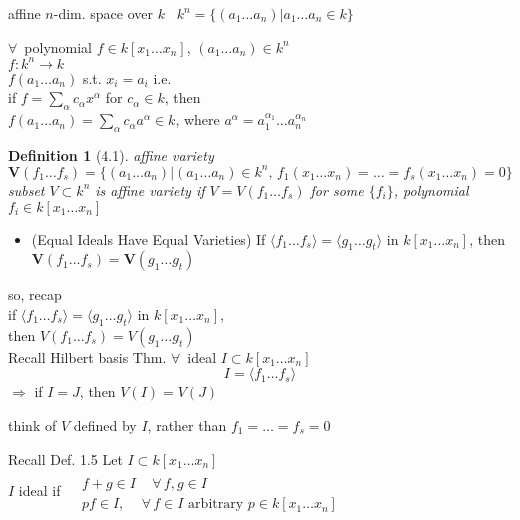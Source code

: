 \documentclass[10pt]{amsart}
\newtheorem{definition}{Definition}
\newcommand{\exercisehead}[1]
  { \smallskip
   \noindent{\small\bf Exercise #1.}
  }
\begin{document}
\begin{multicols*}{2}
affine $n$-dim. space over $k$ \quad \, $k^n = \lbrace (a_1 \dots a_n ) | a_1 \dots a_n \in k \rbrace$

$\forall \, $ polynomial $f\in k[x_1 \dots x_n ]$, $(a_1 \dots a_n) \in k^n$ \\
\phantom{ \quad } $f: k^n \to k$ \\
\phantom{ \quad } $f(a_1 \dots a_n)$ s.t. $x_i = a_i$ i.e. \\

if $f= \sum_{\alpha} c_{\alpha} x^{\alpha}$ for $c_{\alpha} \in k$, then  \\
\phantom{ \quad } $f(a_1 \dots a_n) =\sum_{\alpha} c_{\alpha}a^{\alpha} \in k$, where $a^{\alpha} = a_1^{\alpha_1} \dots a_n^{\alpha_n}$

\begin{definition}[4.1]
affine variety $\mathbf{V}(f_1 \dots f_s) = \lbrace ( a_1 \dots a_n) | (a_1 \dots a_n) \in k^n, \, f_1(x_1 \dots x_n) = \dots = f_s(x_1 \dots x_n) = 0 \rbrace$ \\
subset $V\subset k^n$ is affine variety if $V = V(f_1 \dots f_s)$ for some $\lbrace f_i \rbrace$, polynomial $f_i \in k[x_1 \dots x_n]$
\end{definition}

\begin{itemize}
  \item (Equal Ideals Have Equal Varieties) If $\langle f_1 \dots f_s \rangle = \langle g_1 \dots g_t \rangle$ in $k[x_1 \dots x_n]$, then $\mathbf{V}(f_1 \dots f_s) = \mathbf{V}(g_1 \dots g_t)$
\end{itemize}

so, recap \\
if $\langle f_1 \dots f_s \rangle = \langle g_1 \dots g_t \rangle $ in $k[x_1 \dots x_n]$, \\
then $V(f_1 \dots f_s) = V(g_1 \dots g_t)$   \\

Recall Hilbert basis Thm. $\forall \, $ ideal $I \subset k[x_1 \dots x_n]$ 
\[
I= \langle f_1 \dots f_s \rangle
\]
$\Longrightarrow $ if $I=J$, then $V(I) = V(J)$

think of $V$ defined by $I$, rather than $f_1 = \dots = f_s =0$

\exercisehead{3}

Recall Def. 1.5 Let $I\subset k[x_1 \dots x_n]$ \\
$I$ ideal if $\begin{aligned} & \quad \\
  & f + g \in I  \quad \, \forall \, f,g \in I \\
  & pf \in I, \quad \, \forall \, f \in I \text{ arbitrary } p \in k[x_1 \dots x_n]
\end{aligned}$


\end{multicols*}
\end{document}
